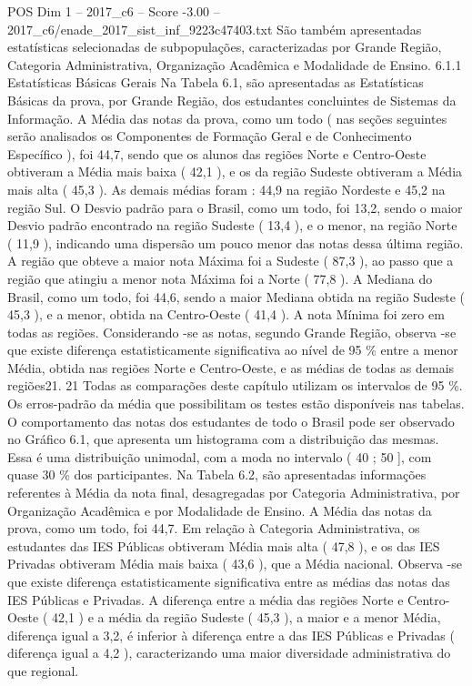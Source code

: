 \begin{textsample}{POS Dim 1 – 2017\_c6 – Score -3.00 – 2017\_c6/enade\_2017\_sist\_inf\_9223c47403.txt}
São também apresentadas estatísticas selecionadas de subpopulações, caracterizadas por Grande Região, Categoria Administrativa, Organização Acadêmica e Modalidade de Ensino. 6.1.1 Estatísticas Básicas Gerais Na Tabela 6.1, são apresentadas as Estatísticas Básicas da prova, por Grande Região, dos estudantes concluintes de Sistemas da Informação.
A Média das notas da prova, como um todo ( nas seções seguintes serão analisados os Componentes de Formação Geral e de Conhecimento Específico ), foi 44,7, sendo que os alunos das regiões Norte e Centro-Oeste obtiveram a Média mais baixa ( 42,1 ), e os da região Sudeste obtiveram a Média mais alta ( 45,3 ).
As demais médias foram : 44,9 na região Nordeste e 45,2 na região Sul.
O Desvio padrão para o Brasil, como um todo, foi 13,2, sendo o maior Desvio padrão encontrado na região Sudeste ( 13,4 ), e o menor, na região Norte ( 11,9 ), indicando uma dispersão um pouco menor das notas dessa última região.
A região que obteve a maior nota Máxima foi a Sudeste ( 87,3 ), ao passo que a região que atingiu a menor nota Máxima foi a Norte ( 77,8 ).
A Mediana do Brasil, como um todo, foi 44,6, sendo a maior Mediana obtida na região Sudeste ( 45,3 ), e a menor, obtida na Centro-Oeste ( 41,4 ).
A nota Mínima foi zero em todas as regiões.
Considerando -se as notas, segundo Grande Região, observa -se que existe diferença estatisticamente significativa ao nível de 95 \% entre a menor Média, obtida nas regiões Norte e Centro-Oeste, e as médias de todas as demais regiões21. 21 Todas as comparações deste capítulo utilizam os intervalos de 95 \%.
Os erros-padrão da média que possibilitam os testes estão disponíveis nas tabelas.
O comportamento das notas dos estudantes de todo o Brasil pode ser observado no Gráfico 6.1, que apresenta um histograma com a distribuição das mesmas.
Essa é uma distribuição unimodal, com a moda no intervalo ( 40 ; 50 ], com quase 30 \% dos participantes.
Na Tabela 6.2, são apresentadas informações referentes à Média da nota final, desagregadas por Categoria Administrativa, por Organização Acadêmica e por Modalidade de Ensino.
A Média das notas da prova, como um todo, foi 44,7.
Em relação à Categoria Administrativa, os estudantes das IES Públicas obtiveram Média mais alta ( 47,8 ), e os das IES Privadas obtiveram Média mais baixa ( 43,6 ), que a Média nacional.
Observa -se que existe diferença estatisticamente significativa entre as médias das notas das IES Públicas e Privadas.
A diferença entre a média das regiões Norte e Centro-Oeste ( 42,1 ) e a média da região Sudeste ( 45,3 ), a maior e a menor Média, diferença igual a 3,2, é inferior à diferença entre a das IES Públicas e Privadas ( diferença igual a 4,2 ), caracterizando uma maior diversidade administrativa do que regional.

\end{textsample}
